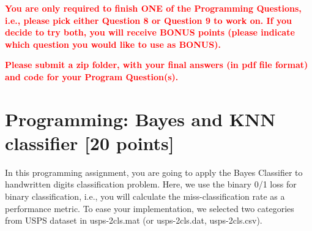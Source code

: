 \documentclass[a4paper,12pt,fleqn]{article}
\begin{document}
\clearpage
\textcolor{red}{\bf
You are only required to finish ONE of the Programming Questions, i.e., please pick either Question 8 or Question 9 to work on. If you decide to try both, you will receive BONUS points (please indicate which question you would like to use as BONUS).
}

\textcolor{red}{\bf Please submit a zip folder, with your final answers (in pdf file format) and code for your Program Question(s).}

\section{Programming: Bayes and KNN classifier [20 points]}


In this programming assignment, you are going to apply the Bayes Classifier to handwritten digits classification problem. Here, we use the binary 0/1 loss for binary classification, i.e., you will calculate the miss-classification rate as a performance metric. To ease your implementation, we selected two categories from USPS dataset in \textsf{usps-2cls.mat} (or \textsf{usps-2cls.dat}, \textsf{usps-2cls.csv}).
\end{document}
